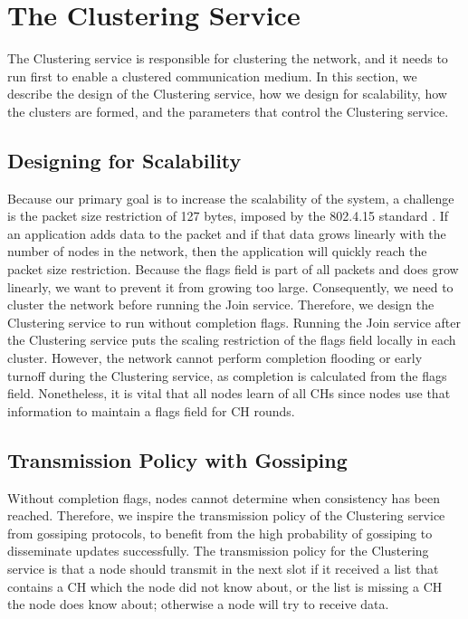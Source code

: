 \section{The Clustering Service}
The Clustering service is responsible for clustering the network, and it needs to run first to enable a clustered communication medium. In this section, we describe the design of the Clustering service, how we design for scalability, how the clusters are formed, and the parameters that control the Clustering service.


\subsection{Designing for Scalability}
Because our primary goal is to increase the scalability of the \atwo{} system, a challenge is the packet size restriction of 127 bytes, imposed by the 802.4.15 standard \cite{IEEE-802-15-4}. If an application adds data to the packet and if that data grows linearly with the number of nodes in the network, then the application will quickly reach the packet size restriction. Because the flags field is part of all packets and does grow linearly, we want to prevent it from growing too large. Consequently, we need to cluster the network before running the Join service. Therefore, we design the Clustering service to run without completion flags. Running the Join service after the Clustering service puts the scaling restriction of the flags field locally in each cluster. However, the network cannot perform completion flooding or early turnoff during the Clustering service, as completion is calculated from the flags field. Nonetheless, it is vital that all nodes learn of all CHs since nodes use that information to maintain a flags field for CH rounds.

\subsection{Transmission Policy with Gossiping}
Without completion flags, nodes cannot determine when consistency has been reached. Therefore, we inspire the transmission policy of the Clustering service from gossiping protocols, to benefit from the high probability of gossiping to disseminate updates successfully. The transmission policy for the Clustering service is that a node should transmit in the next slot if it received a list that contains a CH which the node did not know about, or the list is missing a CH the node does know about; otherwise a node will try to receive data.


